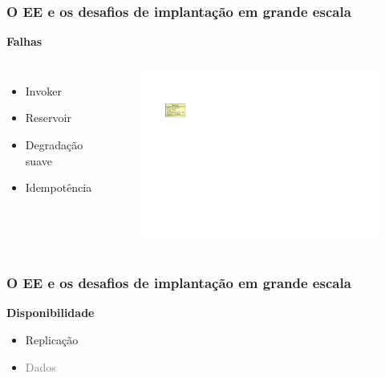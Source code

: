 \documentclass{beamer}
\newcommand\subtitulo[1]{{\large \textbf{#1}}}
\begin{document}

\begin{frame}
\frametitle{O EE e os desafios de implantação em grande escala}

\subtitulo{Falhas}

\vspace{1cm}

\begin{columns}[c]

\begin{itemize}
\item Invoker
\item Reservoir
\item Degradação suave
\item Idempotência
\end{itemize}

\begin{figure}
\includegraphics[width=0.8\linewidth]{img/invoker}
\end{figure}

\end{columns}
\end{frame}



\begin{frame}
\frametitle{O EE e os desafios de implantação em grande escala}

\subtitulo{Disponibilidade}

\vspace{1cm}

\begin{itemize}
\item Replicação
\item \textcolor{gray}{Dados}
\end{itemize}

\end{frame}
\end{document}
